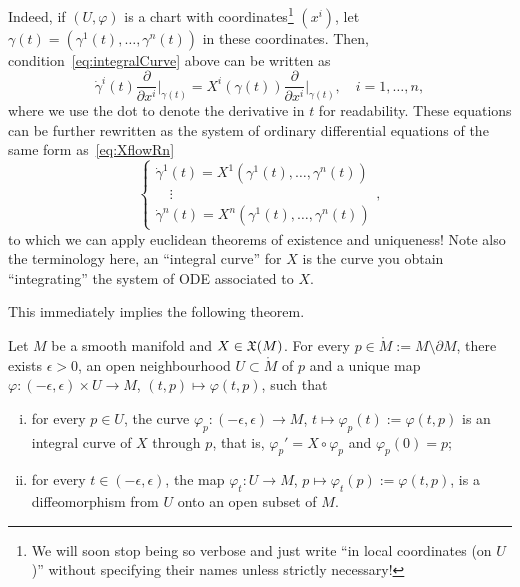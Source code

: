 Indeed, if $(U, \varphi)$ is a chart with coordinates\footnote{We will soon stop being so verbose and just write ``in local coordinates (on $U$)'' without specifying their names unless strictly necessary!} $(x^i)$, let $\gamma(t) = (\gamma^1(t), \ldots, \gamma^n(t))$ in these coordinates. Then, condition~\eqref{eq:integralCurve} above can be written as
\begin{equation}
  \dot\gamma^i(t)\frac{\partial}{\partial x^i}\Big|_{\gamma(t)}
  = X^i(\gamma(t))\frac{\partial}{\partial x^i}\Big|_{\gamma(t)},\quad i=1,\ldots,n,
\end{equation}
where we use the dot to denote the derivative in $t$ for readability.
These equations can be further rewritten as the system of ordinary differential equations of the same form as~\eqref{eq:XflowRn}
\begin{equation}
  \begin{cases}
    \dot\gamma^1(t) = X^1(\gamma^1(t), \ldots, \gamma^n(t)) \\
    \quad \vdots \\
    \dot\gamma^n(t) = X^n(\gamma^1(t), \ldots, \gamma^n(t))
  \end{cases},
\end{equation}
to which we can apply euclidean theorems of existence and uniqueness!
Note also the terminology here, an ``integral curve'' for $X$ is the curve you obtain ``integrating'' the system of ODE associated to $X$.

This immediately implies the following theorem.

\begin{theorem} %
  \label{thm:exuniqloc}
  Let $M$ be a smooth manifold and $X\in\mathfrak{X}(M)$. For every $p\in \mathring M := M\setminus \partial M$, there exists $\epsilon > 0$, an open neighbourhood $U\subset\mathring M$ of $p$ and a unique map $\varphi : (-\epsilon, \epsilon) \times U \to M$, $(t, p) \mapsto \varphi(t,p)$, such that
  \begin{enumerate}[(i)]
    \item for every $p\in U$, the curve $\varphi_p : (-\epsilon, \epsilon) \to M$, $t\mapsto \varphi_p(t) := \varphi(t, p)$ is an integral curve of $X$ through $p$, that is, $\varphi_p' = X\circ\varphi_p$ and $\varphi_p(0) = p$;
    \item for every $t\in(-\epsilon, \epsilon)$, the map $\varphi_t: U \to M$, $p\mapsto \varphi_t(p):=\varphi(t,p)$, is a diffeomorphism from $U$ onto an open subset of $M$.
  \end{enumerate}
\end{theorem}
  
